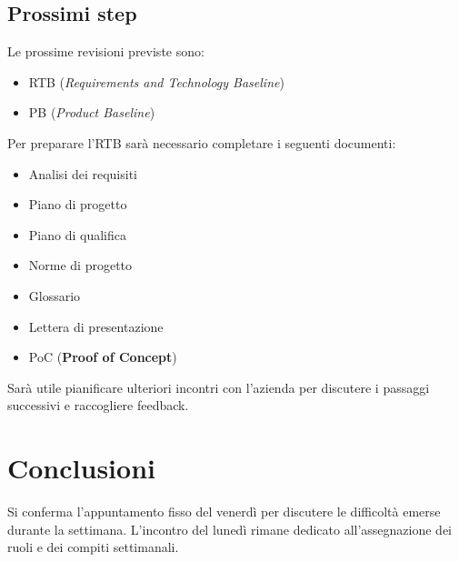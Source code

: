 \documentclass{article}
\begin{document}
\subsection{Prossimi step} 
Le prossime revisioni previste sono:
\begin{itemize}
    \item RTB (\textit{Requirements and Technology Baseline})
    \item PB (\textit{Product Baseline})
\end{itemize}
Per preparare l'RTB sarà necessario completare i seguenti documenti:
\begin{itemize} 
    \item Analisi dei requisiti 
    \item Piano di progetto 
    \item Piano di qualifica 
    \item Norme di progetto 
    \item Glossario 
    \item Lettera di presentazione 
    \item PoC (\textbf{Proof of Concept}) 
\end{itemize}
Sarà utile pianificare ulteriori incontri con l'azienda per discutere i passaggi successivi e raccogliere feedback.

\section{Conclusioni}
Si conferma l'appuntamento fisso del venerdì per discutere le difficoltà emerse durante la settimana.
L'incontro del lunedì rimane dedicato all'assegnazione dei ruoli e dei compiti settimanali.
\end{document}
